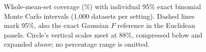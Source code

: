 \begin{figure}
\caption{Whole-mean-set coverage (\%) with individual 95\% exact binomial
Monte Carlo intervals (1,000 datasets per setting). Dashed lines mark 95\%,
also the exact Gaussian $F$ reference in the Euclidean panels.
Circle's vertical scales meet at 88\%, compressed below and expanded
above; no percentage range is omitted.}
\label{fig:coverage}
\end{figure}
